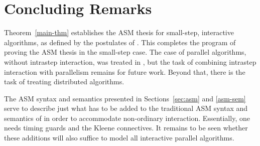 \documentclass{LMCS}
\theoremstyle{definition}
\begin{document}
\section{Concluding Remarks}

Theorem~\ref{main-thm} establishes the ASM thesis for small-step,
interactive algorithms, as defined by the postulates of \cite{ga1}.
This completes the program of proving the ASM thesis in the small-step
case.  The case of parallel algorithms, without intrastep interaction,
was treated in \cite{parth}, but the task of combining intrastep
interaction with parallelism remains for future work.  Beyond that,
there is the task of treating distributed algorithms.  

The ASM syntax and semantics presented in Sections~\ref{sec:asm} and
\ref{asm-sem} serve to describe just what has to be added to the
traditional ASM syntax and semantics of \cite{G103} in order to
accommodate non-ordinary interaction.  Essentially, one needs timing
guards and the Kleene connectives.  It remains to be seen whether
these additions will also suffice to model all interactive parallel
algorithms.  
\end{document}
